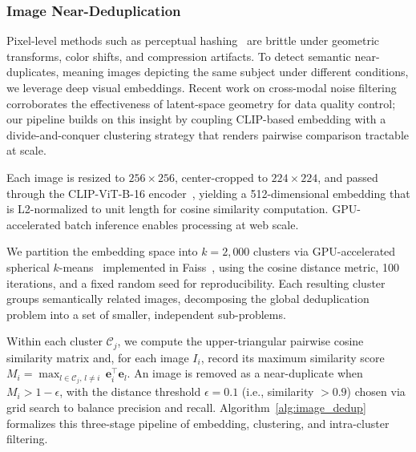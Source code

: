 \documentclass[conference]{IEEEtran}
\begin{document}
\subsubsection{Image Near-Deduplication}

Pixel-level methods such as perceptual hashing~\cite{jain2023deep} are brittle under geometric transforms, color shifts, and compression artifacts. To detect semantic near-duplicates, meaning images depicting the same subject under different conditions, we leverage deep visual embeddings.
Recent work on cross-modal noise filtering~\cite{chen2025syntheclean} corroborates the effectiveness of latent-space geometry for data quality control; our pipeline builds on this insight by coupling CLIP-based embedding with a divide-and-conquer clustering strategy that renders pairwise comparison tractable at scale.

Each image is resized to $256 \times 256$, center-cropped to $224 \times 224$, and passed through the CLIP-ViT-B-16 encoder~\cite{radford2021learning}, yielding a 512-dimensional embedding that is L2-normalized to unit length for cosine similarity computation. GPU-accelerated batch inference enables processing at web scale.

We partition the embedding space into $k{=}2{,}000$ clusters via GPU-accelerated spherical $k$-means~\cite{dhillon2001concept} implemented in Faiss~\cite{douze2017faiss}, using the cosine distance metric, 100 iterations, and a fixed random seed for reproducibility. Each resulting cluster groups semantically related images, decomposing the global deduplication problem into a set of smaller, independent sub-problems.

Within each cluster $\mathcal{C}_j$, we compute the upper-triangular pairwise cosine similarity matrix and, for each image $I_i$, record its maximum similarity score $M_i = \max_{l \in \mathcal{C}_j,\, l \neq i}\, \mathbf{e}_i^\top \mathbf{e}_l$. An image is removed as a near-duplicate when $M_i > 1 - \epsilon$, with the distance threshold $\epsilon = 0.1$ (i.e., similarity $> 0.9$) chosen via grid search to balance precision and recall. Algorithm~\ref{alg:image_dedup} formalizes this three-stage pipeline of embedding, clustering, and intra-cluster filtering.
\end{document}
